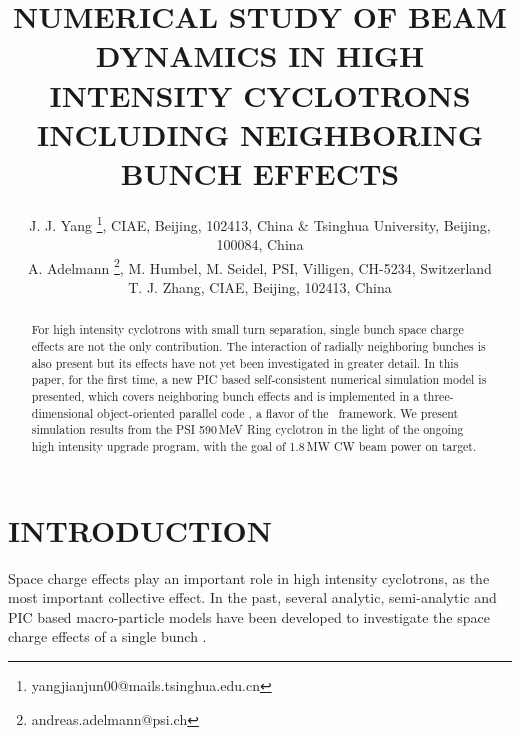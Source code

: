 \documentclass{JAC2003}
\begin{document}
\title{NUMERICAL STUDY OF BEAM DYNAMICS IN HIGH INTENSITY CYCLOTRONS INCLUDING NEIGHBORING BUNCH EFFECTS}

\author{J. J. Yang \thanks{yangjianjun00@mails.tsinghua.edu.cn}, 
  CIAE, Beijing, 102413, China \&
  Tsinghua University, Beijing, 100084, China\\
  A. Adelmann \thanks{andreas.adelmann@psi.ch},
  M. Humbel,
  M. Seidel,
  PSI, Villigen, CH-5234, Switzerland\\
  T. J. Zhang, 
  CIAE, Beijing, 102413, China\\}


\maketitle

\begin{abstract}
  For high intensity cyclotrons with small turn separation, single bunch space charge effects are not the only contribution. 
  The interaction of radially neighboring bunches is also present but its effects have not yet been investigated in greater detail.
  In this paper, for the first time, a new PIC based self-consistent numerical simulation model is presented, 
  which covers neighboring bunch effects and is implemented in a three-dimensional object-oriented parallel code \opalcycl,
  a flavor of the \opal \  framework. 
  We present simulation results from the PSI 590\,MeV Ring cyclotron in the light of the ongoing high intensity upgrade program,
  with the goal of 1.8\,MW CW beam power on target.
\end{abstract}

\section{INTRODUCTION \label{intro}}


Space charge effects play an important role in high intensity cyclotrons, as the most important collective effect. 
In the past, several analytic, semi-analytic and PIC based macro-particle models have been developed to investigate the space charge effects of a single bunch \cite{Gordon:1,Joho:1,Adam:1,Adam:2,Ada:1}. 
\end{document}
